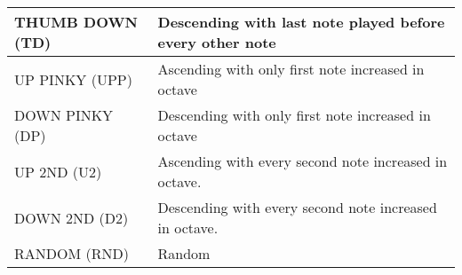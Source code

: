 \begin{tabular}{|l|l|}
THUMB DOWN (TD)                & Descending with last note played before every other note                                                                                                                         \\ \hline
UP PINKY  (UPP)                & Ascending with only first note increased in octave                                                                                                                                                                 \\ \hline
DOWN PINKY (DP)                & Descending with only first note increased in octave                                                                                           
                                       \\ \hline
UP 2ND (U2)                & Ascending with every second note increased in octave.                                                                                             
                                       \\ \hline
DOWN 2ND (D2)                & Descending with every second note increased in octave. 
                                       \\ \hline
RANDOM (RND)                & Random                                                                                                                   
                                       \\ \hline
\end{tabular}
